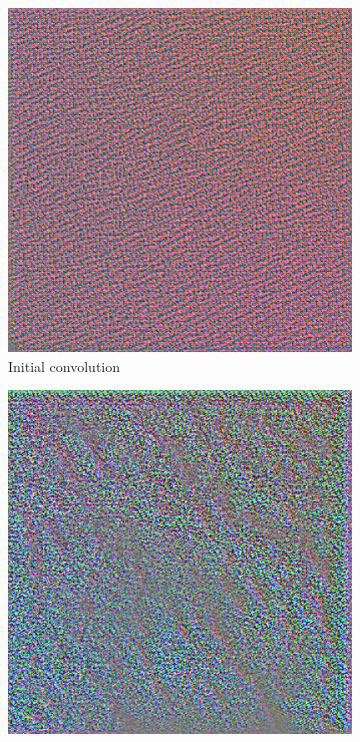 \documentclass{kththesis}
\begin{document}
\begin{figure}
  \begin{subfigure}{.5\textwidth}
    \centering
    \includegraphics[width=0.9\linewidth]{img/layer0.png}
    \caption{Initial convolution}
    \label{fig:layer0}
  \end{subfigure}%
  \begin{subfigure}{.5\textwidth}
    \centering
    \includegraphics[width=0.9\linewidth]{img/layer1.png}

\end{subfigure}
\end{figure}
\end{document}
